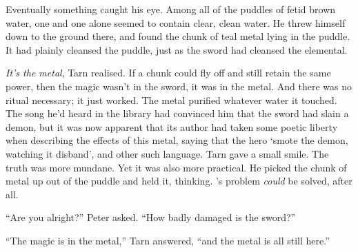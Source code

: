 Eventually something caught his eye.  Among all of the puddles of fetid brown water, one and one alone seemed to contain clear, clean water.  He threw himself down to the ground there, and found the chunk of teal metal lying in the puddle.  It had plainly cleansed the puddle, just as the sword had cleansed the elemental.

\emph{It's the metal}, Tarn realised.  If a chunk could fly off and still retain the same power, then the magic wasn't in the sword, it was in the metal.  And there was no ritual necessary; it just worked.  The metal purified whatever water it touched.  The song he'd heard in the library had convinced him that the sword had slain a demon, but it was now apparent that its author had taken some poetic liberty when describing the effects of this metal, saying that the hero `smote the demon, watching it disband', and other such language.  Tarn gave a small smile.  The truth was more mundane.  Yet it was also more practical.  He picked the chunk of metal up out of the puddle and held it, thinking.  \korbarthrond's problem \emph{could} be solved, after all.

``Are you alright?'' Peter asked.  ``How badly damaged is the sword?''

``The magic is in the metal,'' Tarn answered, ``and the metal is all still here.''